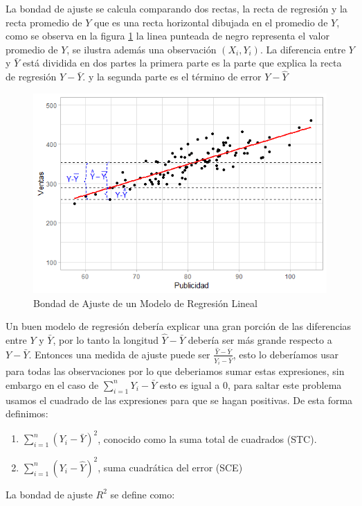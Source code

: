 \documentclass[
]{krantz}
\providecommand{\tightlist}{%
  \setlength{\itemsep}{0pt}\setlength{\parskip}{0pt}}
\begin{document}
La bondad de ajuste se calcula comparando dos rectas, la recta de regresión y la recta promedio de \(Y\) que es una recta horizontal dibujada en el promedio de \(Y\), como se observa en la figura \ref{fig:determinacion} la linea punteada de negro representa el valor promedio de \(Y\), se ilustra además una observación \(\left(X_i,Y_i\right)\). La diferencia entre \(Y\) y \(\bar{Y}\) está dividida en dos partes la primera parte es la parte que explica la recta de regresión \(\hat{Y}-\bar{Y}\). y la segunda parte es el término de error \(Y-\hat{Y}\)

\begin{figure}[!h]

{\centering \includegraphics[width=0.5\linewidth]{error5} 

}

\caption{Bondad de Ajuste de un Modelo de Regresión Lineal}\label{fig:determinacion}
\end{figure}

Un buen modelo de regresión debería explicar una gran porción de las diferencias entre \(Y\) y \(\bar{Y}\), por lo tanto la longitud \(\hat{Y}-\bar{Y}\) debería ser más grande respecto a \(Y-\bar{Y}\). Entonces una medida de ajuste puede ser \(\frac{\hat{Y}-\bar{Y}}{Y_i-\bar{Y}}\), esto lo deberíamos usar para todas las observaciones por lo que deberiamos sumar estas expresiones, sin embargo en el caso de \(\sum_{i=1}^{n}{Y_i-\bar{Y}}\) esto es igual a \(0\), para saltar este problema usamos el cuadrado de las expresiones para que se hagan positivas. De esta forma definimos:

\begin{enumerate}
\def\labelenumi{\arabic{enumi}.}
\tightlist
\item
  \(\sum_{i=1}^{n}{\left(Y_i-\bar{Y}\right)^2}\), conocido como la suma total de cuadrados (STC).
\item
  \(\sum_{i=1}^{n}{\left(Y_i-\hat{Y}\right)^2}\), suma cuadrática del error (SCE)
\end{enumerate}

La bondad de ajuste \(R^2\) se define como:
\end{document}
